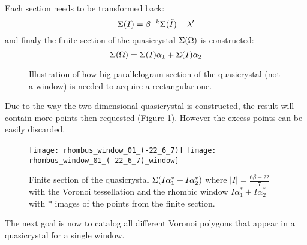 \documentclass[text.tex]{subfiles}
\begin{document}
Each section needs to be transformed back:
$$\Sigma(I) = \beta^{-k}\Sigma(\tilde{I}) + \lambda'$$
and finaly the finite section of the quasicrystal $\Sigma(\Omega)$ is constructed:
$$\Sigma(\Omega) = \Sigma(I)\alpha_1 + \Sigma(I)\alpha_2$$

\begin{figure}[h]
\centering
{}
\caption{Illustration of how big parallelogram section of the quasicrystal (not a window) is needed to acquire a rectangular one.}
\label{fig:finiteSectionRhombus}
\end{figure}

\begin{remark}
Due to the way the two-dimensional quasicrystal is constructed, the result will contain more points then requested (Figure \ref{fig:finiteSectionRhombus}). However the excess points can be easily discarded.
\end{remark}

\begin{figure}[h]
\centering
\texttt{[image: rhombus\_window\_01\_(-22\_6\_7)]}
\texttt{[image: rhombus\_window\_01\_(-22\_6\_7)\_window]}
\caption{Finite section of the quasicrystal $\Sigma(I\alpha_1^\ast + I\alpha_2^\ast)$ where $|I| = \frac{6\beta-22}{7}$ with the Voronoi tessellation and the rhombic window $I\alpha_1^\ast + I\alpha_2^\ast$ with $\ast$ images of the points from the finite section.}
\label{fig:finiteSectionQuasi}
\end{figure}

The next goal is now to catalog all different Voronoi polygons that appear in a quasicrystal for a single window. 
\end{document}
